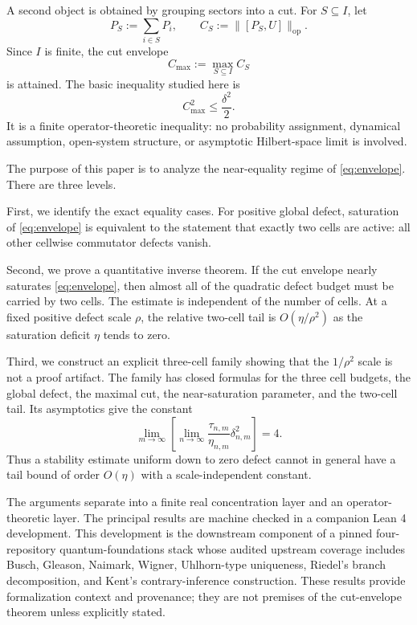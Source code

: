 \documentclass[11pt]{article}
\newcommand{\op}{\mathrm{op}}
\newcommand{\cmax}{C_{\max}}
\newcommand{\dd}{\delta}
\newcommand{\etaq}{\eta}
\newcommand{\tauq}{\tau}
\begin{document}
A second object is obtained by grouping sectors into a cut.  For
$S\subseteq I$, let
\[
  P_S:=\sum_{i\in S}P_i,\qquad
  C_S:=\|[P_S,U]\|_{\op}.
\]
Since $I$ is finite, the cut envelope
\[
  \cmax:=\max_{S\subseteq I}C_S
\]
is attained.  The basic inequality studied here is
\begin{equation}\label{eq:envelope}
  \cmax^2\le \frac{\dd^2}{2}.
\end{equation}
It is a finite operator-theoretic inequality: no probability assignment,
dynamical assumption, open-system structure, or asymptotic Hilbert-space
limit is involved.

The purpose of this paper is to analyze the near-equality regime of
\eqref{eq:envelope}.  There are three levels.

First, we identify the exact equality cases.  For positive global defect,
saturation of \eqref{eq:envelope} is equivalent to the statement that exactly
two cells are active: all other cellwise commutator defects vanish.

Second, we prove a quantitative inverse theorem.  If the cut envelope nearly
saturates \eqref{eq:envelope}, then almost all of the quadratic defect budget
must be carried by two cells.  The estimate is independent of the number of
cells.  At a fixed positive defect scale $\rho$, the relative two-cell tail is
$O(\etaq/\rho^2)$ as the saturation deficit $\etaq$ tends to zero.

Third, we construct an explicit three-cell family showing that the
$1/\rho^2$ scale is not a proof artifact.  The family has closed formulas for
the three cell budgets, the global defect, the maximal cut, the
near-saturation parameter, and the two-cell tail.  Its asymptotics give the
constant
\[
  \lim_{m\to\infty}\left[
    \lim_{n\to\infty}\frac{\tauq_{n,m}}{\etaq_{n,m}}\dd_{n,m}^2
  \right]=4.
\]
Thus a stability estimate uniform down to zero defect cannot in general have
a tail bound of order $O(\etaq)$ with a scale-independent constant.

The arguments separate into a finite real concentration layer and an
operator-theoretic layer.  The principal results are machine checked in a
companion Lean 4 development.  This development is the downstream component
of a pinned four-repository quantum-foundations stack whose audited upstream
coverage includes Busch, Gleason, Naimark, Wigner, Uhlhorn-type uniqueness,
Riedel's branch decomposition, and Kent's contrary-inference construction.
These results provide formalization context and provenance; they are not
premises of the cut-envelope theorem unless explicitly stated.
\end{document}
